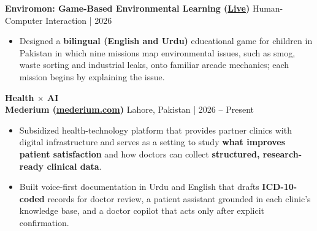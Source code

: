 \documentclass[11pt]{article}
\begin{document}
\textbf{Enviromon: Game-Based Environmental Learning (\href{https://qasimayub.github.io/Enviromon/}{Live})} \hfill Human-Computer Interaction | 2026
\begin{itemize}[noitemsep, topsep=0pt, partopsep=0pt, parsep=0pt]
    \item Designed a \textbf{bilingual (English and Urdu)} educational game for children in Pakistan in which nine missions map environmental issues, such as smog, waste sorting and industrial leaks, onto familiar arcade mechanics; each mission begins by explaining the issue.
\end{itemize}

\vspace{0.3cm}
{\large \textbf{Health $\times$ AI}}
\vspace{0.15cm}\\
\textbf{Mederium (\href{https://mederium.com}{mederium.com})} \hfill Lahore, Pakistan | 2026 – Present
\begin{itemize}[noitemsep, topsep=0pt, partopsep=0pt, parsep=0pt]
    \item Subsidized health-technology platform that provides partner clinics with digital infrastructure and serves as a setting to study \textbf{what improves patient satisfaction} and how doctors can collect \textbf{structured, research-ready clinical data}.
    \item Built voice-first documentation in Urdu and English that drafts \textbf{ICD-10-coded} records for doctor review, a patient assistant grounded in each clinic's knowledge base, and a doctor copilot that acts only after explicit confirmation.
\end{itemize}
\end{document}
